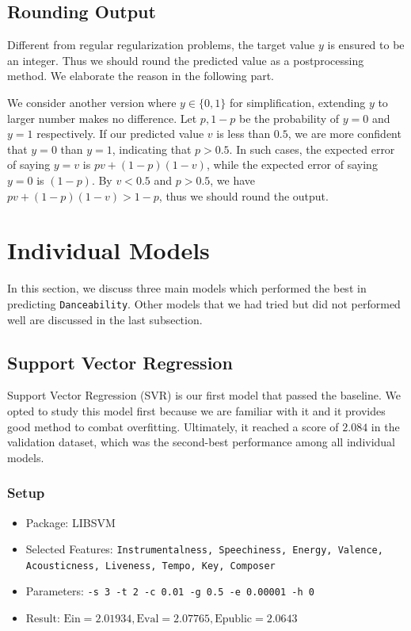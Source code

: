 \documentclass[10pt,letterpaper]{article}
\begin{document}
\subsection{Rounding Output}

Different from regular regularization problems, the target value $y$ is ensured to be an integer. Thus we should round the predicted value as a postprocessing method. We elaborate the reason in the following part. 

We consider another version where $y \in \{0, 1\}$ for simplification, extending $y$ to larger number makes no difference. Let $p, 1-p$ be the probability of $y = 0$ and $y = 1$ respectively. If our predicted value $v$ is less than $0.5$, we are more confident that $y = 0$ than $y = 1$, indicating that $p > 0.5$. In such cases, the expected error of saying $y = v$ is $pv + (1-p)(1-v)$, while the expected error of saying $y = 0$ is $(1-p)$. By $v < 0.5$ and $p > 0.5$, we have $pv + (1-p)(1-v) > 1-p$, thus we should round the output. 

\section{Individual Models}

In this section, we discuss three main models which performed the best in predicting \texttt{Danceability}. Other models that we had tried but did not performed well are discussed in the last subsection. 

\subsection{Support Vector Regression}

Support Vector Regression (SVR) is our first model that passed the baseline. We opted to study this model first because we are familiar with it and it provides good method to combat overfitting. Ultimately, it reached a score of $2.084$ in the validation dataset, which was the second-best performance among all individual models. 

\subsubsection{Setup}
\begin{itemize}
	\item Package: LIBSVM
	\item Selected Features: \texttt{Instrumentalness, Speechiness, Energy, Valence, Acousticness, Liveness, Tempo, Key, Composer}
	\item Parameters: \texttt{-s 3 -t 2 -c 0.01 -g 0.5 -e 0.00001 -h 0}
	\item Result: $\text{Ein} = 2.01934, \text{Eval} = 2.07765, \text{Epublic} = 2.0643$
\end{itemize}
\end{document}
